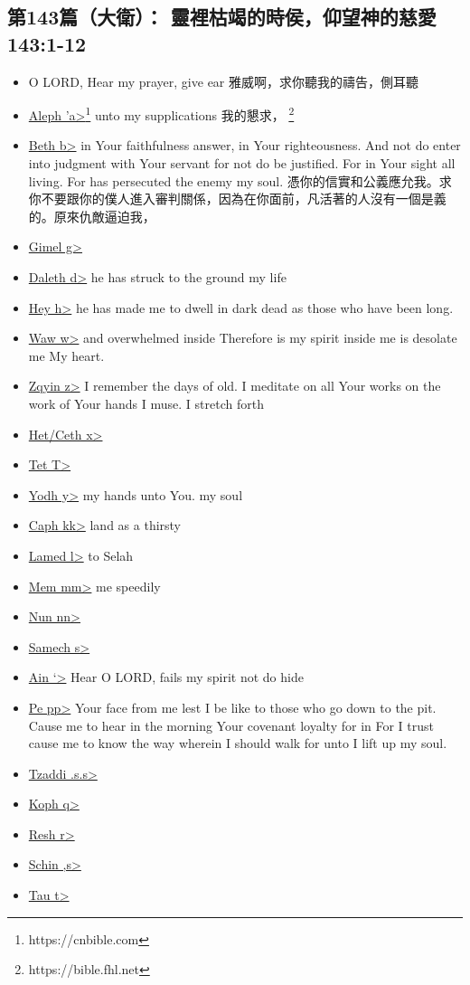 \subsection{第143篇（大衛）： 靈裡枯竭的時侯，仰望神的慈愛 143:1-12}
\begin{itemize}
\itemsep-.45em  
\item  O LORD, Hear my prayer, give ear 雅威啊，求你聽我的禱告，側耳聽
\item \underline{Aleph \<'a>}\footnote{https://cnbible.com} unto my supplications 我的懇求， \footnote{https://bible.fhl.net}
\item \underline{Beth \<b>} in Your faithfulness answer, in Your righteousness. And not do enter into judgment with Your servant for not do be justified. For in Your sight all living. For has persecuted the enemy my soul. 憑你的信實和公義應允我。求你不要跟你的僕人進入審判關係，因為在你面前，凡活著的人沒有一個是義的。原來仇敵逼迫我，
\item \underline{Gimel \<g>} 
\item \underline{Daleth \<d>} he has struck to the ground my life
\item \underline{Hey \<h>} he has made me to dwell in dark dead as those who have been long.
\item \underline{Waw \<w>} and overwhelmed inside Therefore is my spirit inside me is desolate me My heart.
\item \underline{Zqyin  \<z>} I remember the days of old. I meditate on all Your works on the work of Your hands I muse. I stretch forth 
\item \underline{Het/Ceth  \<x>} 
\item \underline{Tet  \<T>} 
\item \underline{Yodh \<y>} my hands unto You. my soul 
\item \underline{Caph \<kk>} land as a thirsty
\item \underline{Lamed \<l>} to Selah 
\item \underline{Mem \<mm>} me speedily 
\item \underline{Nun \<nn>} 
\item \underline{Samech \<s>} 
\item \underline{Ain \<`>} Hear O LORD, fails my spirit not do hide 
\item \underline{Pe \<pp>} Your face from me lest I be like to those who go down to the pit. Cause me to hear in the morning Your covenant loyalty for in For I trust cause me to know the way wherein I should walk for unto I lift up my soul.
\item \underline{Tzaddi \<.s.s>}
\item \underline{Koph \<q>} 
\item \underline{Resh  \<r>} 
\item \underline{Schin \<,s>} 
\item \underline{Tau \<t>} 
\end{itemize}

